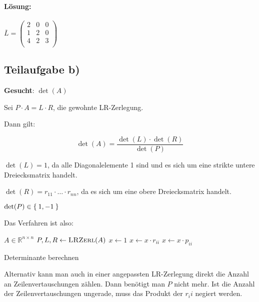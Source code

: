 \paragraph{Lösung:}
$
\overline{L} =
\begin{pmatrix}
2 & 0 & 0 \\
1 & 2 & 0 \\
4 & 2 & 3 \\
\end{pmatrix}
$


\subsection*{Teilaufgabe b)}
\textbf{Gesucht}: $\det(A)$

Sei $P \cdot A = L \cdot R$, die gewohnte LR-Zerlegung.

Dann gilt:

\[\det(A) = \frac{\det(L) \cdot \det(R)}{\det(P)}\]

$\det(L) = 1$, da alle Diagonalelemente 1 sind und es sich um eine strikte untere Dreiecksmatrix handelt.

$\det(R) = r_{11} \cdot \ldots \cdot r_{nn}$, da es sich um eine obere Dreiecksmatrix handelt.


$\det(P) \in \Set{1, -1}$

Das Verfahren ist also:

\begin{algorithm}[H]
    \begin{algorithmic}
        \Require $A \in \mathbb{R}^{n \times n}$
        \State $P, L, R \gets \Call{LRZerl}{A}$
        \State $x \gets 1$
            \State $x \gets x \cdot r_{ii}$
            \State $x \gets x \cdot p_{ii}$
        \EndFor
    \end{algorithmic}
\caption{Determinante berechnen}
\label{alg:seq1}
\end{algorithm}

Alternativ kann man auch in einer angepassten LR-Zerlegung direkt die
Anzahl an Zeilenvertauschungen zählen. Dann benötigt man $P$ nicht mehr.
Ist die Anzahl der Zeilenvertauschungen ungerade, muss das Produkt 
der $r_ii$ negiert werden.
